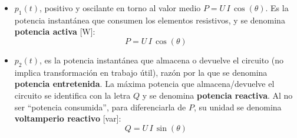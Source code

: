 	\begin{itemize}
        \item $p_1(t)$, positivo y oscilante en torno al valor medio
          $P=U\,I\,\cos(\theta)$. Es la potencia instantánea que
          consumen los elementos resistivos, y se denomina
          \textbf{potencia activa} [W]:
          \begin{equation}
            \boxed{P=U\,I\,\cos(\theta)}
          \end{equation}
        \item $p_2(t)$, es la potencia instantánea que almacena o
          devuelve el circuito (no implica transformación en trabajo
          útil), razón por la que se denomina \textbf{potencia
            entretenida}. La máxima potencia que almacena/devuelve el
          circuito se identifica con la letra $Q$ y se denomina
          \textbf{potencia reactiva}. Al no ser ``potencia
          consumida'', para diferenciarla de $P$, su unidad se
          denomina \textbf{voltamperio reactivo} [var]:
          \begin{equation}
            \boxed{Q=U\,I\,\sin(\theta)}
          \end{equation}
	\end{itemize}
	

